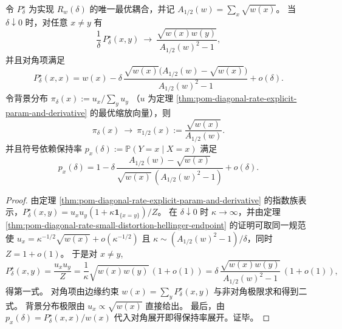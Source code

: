 \begin{theorem}\label{thm:pom-diagonal-rate-rare-mismatch-hellinger-universality}
令 \(P^\star_\delta\) 为实现 \(R_w(\delta)\) 的唯一最优耦合，并记 \(A_{1/2}(w)=\sum_x\sqrt{w(x)}\)。
当 \(\delta\downarrow 0\) 时，对任意 \(x\ne y\) 有
\[
\frac{1}{\delta}\,P^\star_\delta(x,y)\ \longrightarrow\ \frac{\sqrt{w(x)w(y)}}{A_{1/2}(w)^2-1},
\]
并且对角项满足
\[
P^\star_\delta(x,x)
=w(x)-\delta\,\frac{\sqrt{w(x)}\bigl(A_{1/2}(w)-\sqrt{w(x)}\bigr)}{A_{1/2}(w)^2-1}+o(\delta).
\]
令背景分布
\(
\pi_\delta(x):=u_x/\sum_y u_y
\)
（\(u\) 为定理 \ref{thm:pom-diagonal-rate-explicit-param-and-derivative} 的最优缩放向量），则
\[
\pi_\delta(x)\ \longrightarrow\ \pi_{1/2}(x):=\frac{\sqrt{w(x)}}{A_{1/2}(w)}.
\]
并且符号依赖保持率 \(p_x(\delta):=\mathbb P(Y=x\mid X=x)\) 满足
\[
p_x(\delta)
=1-\delta\,\frac{A_{1/2}(w)-\sqrt{w(x)}}{\sqrt{w(x)}\,(A_{1/2}(w)^2-1)}+o(\delta).
\]
\end{theorem}
\begin{proof}
由定理 \ref{thm:pom-diagonal-rate-explicit-param-and-derivative} 的指数族表示，\(P^\star_\delta(x,y)=u_xu_y(1+\kappa\mathbf 1_{\{x=y\}})/Z\)。
在 \(\delta\downarrow 0\) 时 \(\kappa\to\infty\)，并由定理 \ref{thm:pom-diagonal-rate-small-distortion-hellinger-endpoint} 的证明可取同一规范使
\(
u_x=\kappa^{-1/2}\sqrt{w(x)}+o(\kappa^{-1/2})
\)
且
\(
\kappa\sim (A_{1/2}(w)^2-1)/\delta
\)，同时 \(Z=1+o(1)\)。
于是对 \(x\ne y\),
\[
P^\star_\delta(x,y)=\frac{u_xu_y}{Z}
=\frac{1}{\kappa}\sqrt{w(x)w(y)}\,(1+o(1))
=\delta\,\frac{\sqrt{w(x)w(y)}}{A_{1/2}(w)^2-1}\,(1+o(1)),
\]
得第一式。
对角项由边缘约束
\(
w(x)=\sum_y P^\star_\delta(x,y)
\)
与非对角极限求和得到二式。
背景分布极限由 \(u_x\propto \sqrt{w(x)}\) 直接给出。
最后，由
\(
p_x(\delta)=P^\star_\delta(x,x)/w(x)
\)
代入对角展开即得保持率展开。证毕。
\end{proof}







